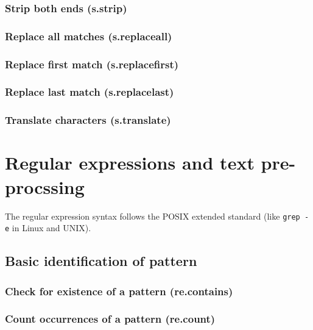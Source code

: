 \documentclass{article}
\theoremstyle{definition}
\begin{document}
\subsubsection{Strip both ends (s.strip)}

\subsubsection{Replace all matches (s.replaceall)}

\subsubsection{Replace first match (s.replacefirst)}

\subsubsection{Replace last match (s.replacelast)}

\subsubsection{Translate characters (s.translate)}

\pagebreak

\section{Regular expressions and text pre-procssing}

The regular expression syntax follows the POSIX extended standard (like {\tt grep -e} in Linux and UNIX).

\subsection{Basic identification of pattern}

\subsubsection{Check for existence of a pattern (re.contains)}

\subsubsection{Count occurrences of a pattern (re.count)}
\end{document}
